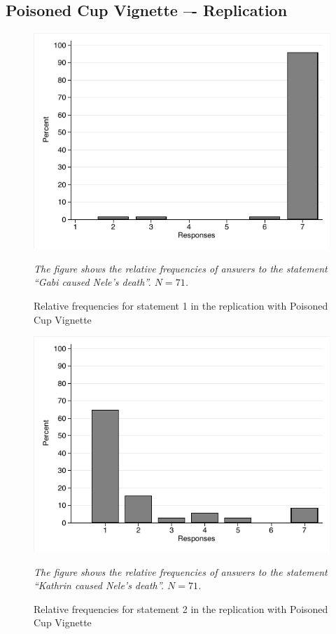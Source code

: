 \documentclass[egregdoesnotlikesansseriftitles,12pt]{scrartcl}
\begin{document}
\subsection{Poisoned Cup Vignette –- Replication}
\begin{figure}[H]
   \centering
   \includegraphics[scale=0.8]{figures/cup_rep_hist_1.pdf}
   \begin{minipage}{0.9\linewidth}
   \footnotesize
   \emph{The figure shows the relative frequencies of answers to the statement ``Gabi caused Nele's death''. $N=71$.}
   \end{minipage}
   \caption{Relative frequencies for statement 1 in the replication with Poisoned Cup Vignette}
   \label{fig:cup_rep_hist_1}
\end{figure}

\begin{figure}[H]
   \centering
   \includegraphics[scale=0.8]{figures/cup_rep_hist_2.pdf}
   \begin{minipage}{0.9\linewidth}
   \footnotesize
   \emph{The figure shows the relative frequencies of answers to the statement ``Kathrin caused Nele's death''. $N=71$.}
   \end{minipage}
   \caption{Relative frequencies for statement 2 in the replication with Poisoned Cup Vignette}
   \label{fig:cup_rep_hist_2}
\end{figure}
\end{document}

